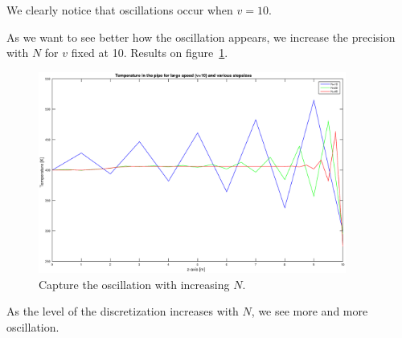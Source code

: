 \documentclass[11pt,a4paper]{report}
\begin{document}
We clearly notice that oscillations occur when $v=10$.


As we want to see better how the oscillation appears, we increase the precision with $N$ for $v$ fixed at 10. Results on figure~\ref{fig:3}.

\begin{figure}[!h]
\centering
\includegraphics[width = 0.9\textwidth]{./fig3.eps}
\caption{Capture the oscillation with increasing $N$.}
\label{fig:3}
\end{figure}

As the level of the discretization increases with $N$, we see more and more oscillation.
\end{document}
